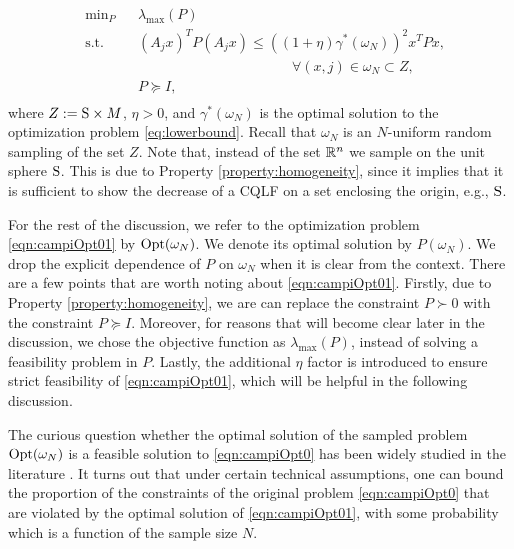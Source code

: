 \begin{equation}\label{eqn:campiOpt01}
\begin{aligned}
& \text{min}_{P} & & \lambda_{\max}(P) \\
& \text{s.t.} 
&  & (A_j x)^TP(A_j x) \leq {((1 +\eta)\gamma^*(\omega_N))}^2 x^TPx,\\
&&&\qquad \qquad \qquad \qquad \quad \qquad \forall (x, j) \in \omega_N \subset Z, \\
& && P \succeq I, \\
\end{aligned}
\end{equation}
where $Z:=\text{S} \times M$, $\eta > 0$, and $\gamma^*(\omega_N)$ is the optimal solution to the optimization problem \eqref{eq:lowerbound}. Recall that $\omega_N$ is an $N$-uniform random sampling of the set $Z$. Note that, instead of the set $\mathbb{R}^n$ we sample on the unit sphere $\text{S}$. This is due to Property \ref{property:homogeneity}, since it implies that it is sufficient to show the decrease of a CQLF on a set enclosing the origin, e.g., $\text{S}$.

For the rest of the discussion, we refer to the optimization problem \eqref{eqn:campiOpt01} by $ \text{Opt}(\omega_N)$. We denote its optimal solution by $P(\omega_N)$. We drop the explicit dependence of $P$ on $\omega_N$ when it is clear from the context. There are a few points that are worth noting about \eqref{eqn:campiOpt01}. Firstly, due to Property \ref{property:homogeneity}, we are can replace the constraint $P \succ 0$ with the constraint $P \succeq I$. Moreover, for reasons that will become clear later in the discussion, we chose the objective function as $\lambda_{\max}(P)$, instead of solving a feasibility problem in $P$. Lastly, the additional $\eta$ factor is introduced to ensure strict feasibility of \eqref{eqn:campiOpt01}, which will be helpful in the following discussion.

The curious question whether the optimal solution of the sampled problem $\text{Opt}(\omega_N)$ is a feasible solution to \eqref{eqn:campiOpt0} has been widely studied in the literature \cite{campi}. It turns out that under certain technical assumptions, one can bound the proportion of the constraints of the original problem \eqref{eqn:campiOpt0} that are violated by the optimal solution of \eqref{eqn:campiOpt01}, with some probability which is a function of the sample size $N$. 

